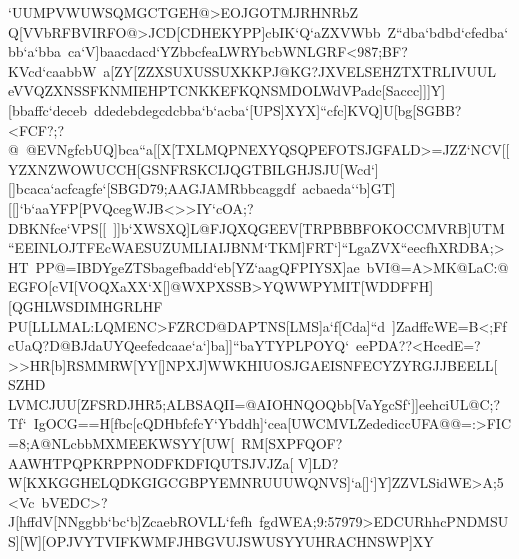 {{{ `UUMPVWUWSQMGCTGEH@>EOJGOTMJRHNRbZ}
 \hbox{Q[VVbRFBVIRFO@>JCD[CDHEKYPP]cbIK`Q`aZXVWbb%
 Z``dba`bdbd`cfedba`bb`a`bba%
 ca`V]baacdacd`YZbbcfeaLWRYbcbWNLGRF<987;BF?KVcd`caabbW%
 a[ZY[ZZXSUXUSSUXKKPJ@KG?JXVELSEHZTXTRLIVUUL}
 \hbox{eVVQZXNSSFKNMIEHPTCNKKEFKQNSMDOLWdVPadc[Saccc]]]Y][bbaffc`deceb%
 ddedebdegcdcbba`b`acba`[UPS]XYX]``cfc]KVQ]U[bg[SGBB?<FCF?;?@%
 @EVNgfcbUQ]bca``a[[X[TXLMQPNEXYQSQPEFOTSJGFALD>=JZZ`NCV[[}
 \hbox{YZXNZWOWUCCH[GSNFRSKCIJQGTBILGHJSJU[Wcd`][]bcaca`acfcagfe`[SBGD79;AAGJAMRbbcaggdf%
 acbaeda``b]GT][[]`b`aaYFP[PVQcegWJB<>>IY`cOA;?DBKNfce`VPS[[%
 ]]b`XWSXQ]L@FJQXQGEEV[TRPBBBFOKOCCMVRB]UTM}
 \hbox{``EEINLOJTFEcWAESUZUMLIAIJBNM`TKM]FRT`]``LgaZVX``eecfhXRDBA;>HT%
 PP@=IBDYgeZTSbagefbadd`eb[YZ`aagQFPIYSX]ae%
 bVI@=A>MK@LaC:@EGFO[cVI[VOQXaXX`X[]@WXPXSSB>YQWWPYMIT[WDDFFH][QGHLWSDIMHGRLHF}
 \hbox{PU[LLLMAL:LQMENC>FZRCD@DAPTNS[LMS]a`f[Cda]``d%
 ]ZadffcWE=B<;FfcUaQ?D@BJdaUYQeefedcaae`a`]ba]]``baYTYPLPOYQ`%
 eePDA??<HcedE=?>>HR[b]RSMMRW[YY[]NPXJ]WWKHIUOSJGAEISNFECYZYRGJJBEELL[%
 SZHD}
 \hbox{LVMCJUU[ZFSRDJHR5;ALBSAQII=@AIOHNQOQbb[VaYgcSf`]]eehciUL@C;?Tf`%
 IgOCG==H[fbc[cQDHbfcfcY`Ybddh]`cea[UWCMVLZedediccUFA@@=:>FIC=8;A@NLcbbMXMEEKWSYY[UW[%
 RM[SXPFQOF?AAWHTPQPKRPPNODFKDFIQUTSJVJZa[}
 \hbox{V]LD?W[KXKGGHELQDKGIGCGBPYEMNRUUUWQNVS]`a[]`]Y]ZZVLSidWE>A;5<Vc%
 bVEDC>?J[hffdV[NNggbb`bc`b]ZcaebROVLL`fefh%
 fgdWEA;9:57979>EDCURhhcPNDMSUS][W][OPJVYTVIFKWMFJHBGVUJSWUSYYUHRACHNSWP]XY%
}}}
